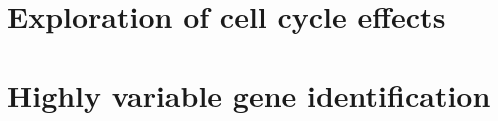 \section{Exploration of cell cycle effects}


\section{Highly variable gene identification}



\clearpage
